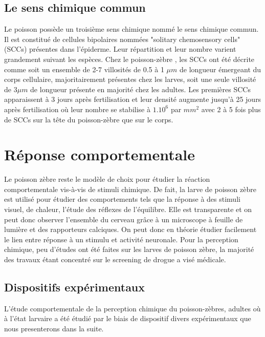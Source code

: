   \subsection{Le sens chimique commun}
  Le poisson possède un troisième sens chimique nommé le sens chimique commun. Il est constitué de cellules bipolaires nommées "solitary chemosensory cells" (SCCs) présentes dans l'épiderme. Leur répartition et leur nombre varient grandement suivant les espèces.
  \medbreak
  Chez le poisson-zèbre \cite{kotrschal1997ontogeny}, les SCCs ont été décrite comme soit un ensemble de 2-7 villosités de 0.5 à 1 $\mu m$ de longueur émergeant du corps cellulaire, majoritairement présentes chez les larves, soit une seule villosité de $3\mu m$ de longueur présente en majorité chez les adultes.
  \medbreak
  Les premières SCCs apparaissent à 3 jours après fertilisation  et leur densité augmente jusqu'à 25 jours après fertilisation où leur nombre se stabilise à $1.10^6$ par $mm^2$ avec 2 à 5 fois plus de SCCs sur la tête du poisson-zèbre que sur le corps.

  \section{Réponse comportementale}
  Le poisson zèbre reste le modèle de choix pour étudier la réaction comportementale vis-à-vis de stimuli chimique. De fait, la larve de poisson zèbre est utilisé pour étudier des comportements tels que la réponse à des stimuli visuel, de chaleur, l'étude des réflexes de l'équilibre. Elle est transparente et on peut donc observer l'ensemble du cerveau grâce à un microscope à feuille de lumière et des rapporteurs calciques. On peut donc en théorie étudier facilement le lien entre réponse à un stimulu et activité neuronale.
  Pour la perception chimique, peu d'études ont été faites sur les larves de poisson zèbre, la majorité des travaux étant concentré sur le screening de drogue a visé médicale.

  \subsection{Dispositifs expérimentaux}
  L'étude comportementale de la perception chimique du poisson-zèbres, adultes où à l'état larvaire a été étudié par le biais de dispositif divers expérimentaux que nous presenterons dans la suite.
